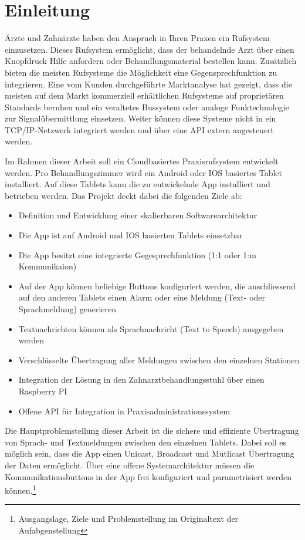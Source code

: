 \section{Einleitung}\label{sec:einleitung}

Ärzte und Zahnärzte haben den Anspruch in Ihren Praxen ein Rufsystem einzusetzen.
Dieses Rufsystem ermöglicht, dass der behandelnde Arzt über einen Knopfdruck Hilfe anfordern oder Behandlungsmaterial bestellen kann.
Zusätzlich bieten die meisten Rufsysteme die Möglichkeit eine Gegensprechfunktion zu integrieren.
Eine vom Kunden durchgeführte Marktanalyse hat gezeigt, dass die meisten auf dem Markt kommerziell erhältlichen Rufsysteme auf proprietären Standards beruhen und ein veraltetes Bussystem oder analoge Funktechnologie zur Signalübermittlung einsetzen.
Weiter können diese Systeme nicht in ein TCP/IP-Netzwerk integriert werden und über eine API extern angesteuert werden.

Im Rahmen dieser Arbeit soll ein Cloudbasiertes Praxisrufsystem entwickelt werden.
Pro Behandlungszimmer wird ein Android oder IOS basiertes Tablet installiert.
Auf diese Tablets kann die zu entwickelnde App installiert und betrieben werden.
Das Projekt deckt dabei die folgenden Ziele ab:

\begin{itemize}
    \item Definition und Entwicklung einer skalierbaren Softwarearchitektur
    \item Die App ist auf Android und IOS basierten Tablets einsetzbar
    \item Die App besitzt eine integrierte Gegesprechfunktion (1:1 oder 1:m Kommunikaion)
    \item Auf der App können beliebige Buttons konfiguriert werden, die anschliessend auf den anderen Tablets einen Alarm oder eine Meldung (Text- oder Sprachmeldung) generieren
    \item Textnachrichten können als Sprachnachricht (Text to Speech) ausgegeben werden
    \item Verschlüsselte Übertragung aller Meldungen zwischen den einzelnen Stationen
    \item Integration der Lösung in den Zahnarztbehandlungsstuhl über einen Raspberry PI
    \item Offene API für Integration in Praxisadministrationssystem
\end{itemize}

Die Hauptproblemstellung dieser Arbeit ist die sichere und effiziente Übertragung von Sprach- und Textmeldungen zwischen den einzelnen Tablets.
Dabei soll es möglich sein, dass die App einen Unicast, Broadcast und Mutlicast Übertragung der Daten ermöglicht.
Über eine offene Systemarchitektur müssen die Kommunikationsbuttons in der App frei konfiguriert und parametrisiert werden können.\cite{aufgabenstellung}\footnote{Ausgangslage, Ziele und Problemstellung im Originaltext der Aufabgenstellung}

